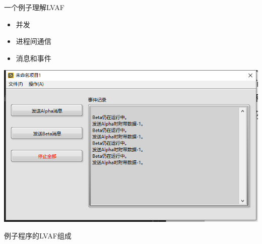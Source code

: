 \documentclass{beamer}
\begin{document}
\begin{frame}[t]{一个例子理解LVAF}
    \begin{itemize}
        \item 并发
        \item 进程间通信
        \item 消息和事件
    \end{itemize}
    \begin{center}
        \includegraphics[scale=0.5]{./resource/graph/actor-framework.jpg}    
    \end{center}
\end{frame}
\begin{frame}[t]{例子程序的LVAF组成}
\end{frame}
\end{document}
